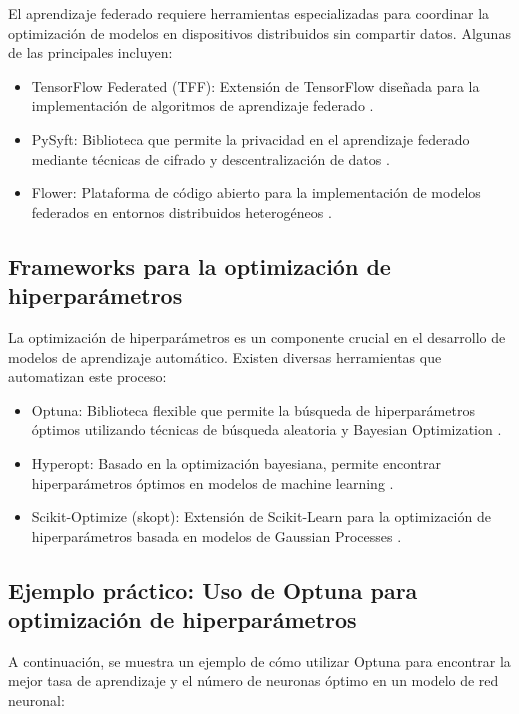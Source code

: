 \begin{itemize}
		El aprendizaje federado requiere herramientas especializadas para coordinar la optimización de modelos en dispositivos distribuidos sin compartir datos. Algunas de las principales incluyen:
		
		\begin{itemize}
			\item TensorFlow Federated (TFF): Extensión de TensorFlow diseñada para la implementación de algoritmos de aprendizaje federado \cite{mcmahan2017communication}.
			\item PySyft: Biblioteca que permite la privacidad en el aprendizaje federado mediante técnicas de cifrado y descentralización de datos \cite{ryffel2018pysyft}.
			\item Flower: Plataforma de código abierto para la implementación de modelos federados en entornos distribuidos heterogéneos \cite{beutel2020flower}.
		\end{itemize}
		
		\subsection{Frameworks para la optimización de hiperparámetros}
		
		La optimización de hiperparámetros es un componente crucial en el desarrollo de modelos de aprendizaje automático. Existen diversas herramientas que automatizan este proceso:
		
\begin{itemize}
			\item Optuna: Biblioteca flexible que permite la búsqueda de hiperparámetros óptimos utilizando técnicas de búsqueda aleatoria y Bayesian Optimization \cite{akiba2019optuna}.
			\item Hyperopt: Basado en la optimización bayesiana, permite encontrar hiperparámetros óptimos en modelos de machine learning \cite{bergstra2013hyperopt}.
			\item Scikit-Optimize (skopt): Extensión de Scikit-Learn para la optimización de hiperparámetros basada en modelos de Gaussian Processes \cite{head2020skopt}.
\end{itemize}
		
\subsection{Ejemplo práctico: Uso de Optuna para optimización de hiperparámetros}
		
		A continuación, se muestra un ejemplo de cómo utilizar Optuna para encontrar la mejor tasa de aprendizaje y el número de neuronas óptimo en un modelo de red neuronal:
		

\end{itemize}
